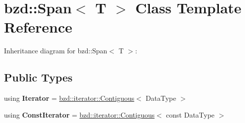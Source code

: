 \hypertarget{classbzd_1_1Span}{}\section{bzd\+:\+:Span$<$ T $>$ Class Template Reference}
\label{classbzd_1_1Span}


Inheritance diagram for bzd\+:\+:Span$<$ T $>$\+:
\subsection*{Public Types}
\begin{DoxyCompactItemize}
\item 
\mbox{\label{classbzd_1_1Span_a05be10d237f4241e1301e0016cfe6bc5}} 
using {\bfseries Iterator} = \hyperlink{classbzd_1_1iterator_1_1Contiguous}{bzd\+::iterator\+::\+Contiguous}$<$ Data\+Type $>$
\item 
\mbox{\label{classbzd_1_1Span_a489018b7f666f0471892f002ac023418}} 
using {\bfseries Const\+Iterator} = \hyperlink{classbzd_1_1iterator_1_1Contiguous}{bzd\+::iterator\+::\+Contiguous}$<$ const Data\+Type $>$
\end{DoxyCompactItemize}
